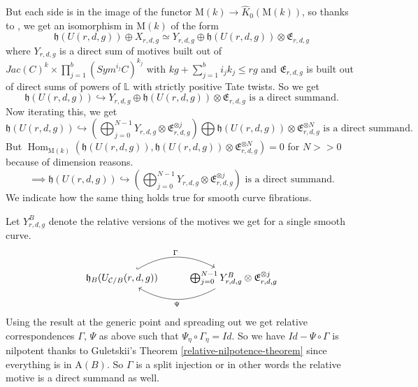 \documentclass[11pt]{amsart}
\theoremstyle{definition}
\begin{document}
But each side is in the image of the functor $\mathrm M(k) \rightarrow \widehat K_0(\mathrm M(k))$, so thanks to \cite[Proposition 2.2]{MR4399901}, we get an isomorphism in $\mathrm M(k)$ of the form \begin{equation*}
    \mathfrak h(U(r,d,g)) \oplus X_{r,d,g} \simeq Y_{r,d,g} \oplus \mathfrak h(U(r,d,g)) \otimes \mathfrak E_{r,d,g}
\end{equation*}   where $Y_{r,d,g}$ is a direct sum of motives built out of $Jac(C)^k \times \prod_{j=1}^b (Sym^{i_j}C)^{k_j}$ with $kg +\sum_{j=1}^bi_jk_j\leq rg$ and $\mathfrak E_{r,d,g}$ is built out of direct sums of powers of $\mathbb L$ with strictly positive Tate twists.
So we get \begin{equation*}
    \mathfrak h(U(r,d,g)) \hookrightarrow  Y_{r,d,g} \oplus \mathfrak h(U(r,d,g)) \otimes \mathfrak E_{r,d,g} \text{ is a direct summand.}
\end{equation*}Now iterating this, we get \begin{equation*}
    \mathfrak h(U(r,d,g)) \hookrightarrow  \left (\bigoplus_{j=0}^{N-1} Y_{r,d,g} \otimes \mathfrak E_{r,d,g}^{\otimes j} \right ) \bigoplus  \mathfrak h(U(r,d,g)) \otimes \mathfrak E_{r,d,g}^{\otimes N} \text{ is a direct summand}. 
\end{equation*} But $\operatorname{Hom}_{\mathrm M(k)} \left (   \mathfrak h(U(r,d,g)), \mathfrak h(U(r,d,g)) \otimes \mathfrak E_{r,d,g}^{\otimes N}\right ) =0$ for $N>>0$ because of dimension reasons. \begin{equation*}
    \implies  \mathfrak h(U(r,d,g)) \hookrightarrow  \left (\bigoplus_{j=0}^{N-1} Y_{r,d,g} \otimes \mathfrak E_{r,d,g}^{\otimes j} \right ) \text{ is a direct summand}. 
\end{equation*}We indicate how the same thing holds true for smooth curve fibrations. 

\noindent Let $Y^B_{r,d,g}$ denote the relative versions of the motives we get for a single smooth curve.   \begin{equation*} \begin{tikzcd}
    \mathfrak h_B ( U_{\mathcal C/B}(r,d,g)) \arrow[hook, bend left]{r}{\Gamma} &  \bigoplus_{j=0}^{N-1} Y_{r,d,g}^B \otimes \mathfrak E_{r,d,g}^{\otimes j} \arrow[bend left]{l}{\Psi} \end{tikzcd}
\end{equation*} Using the result at the generic point and spreading out we get relative correspondences $\Gamma$, $\Psi$ as above such that $\Psi_\eta \circ \Gamma_\eta =Id$. So we have $Id-\Psi\circ \Gamma$ is nilpotent thanks to Guletskii's Theorem \ref{relative-nilpotence-theorem} since everything is in $\mathrm A(B)$. So $\Gamma$ is a split injection or in other words the relative motive is a direct summand as well.
\end{document}
